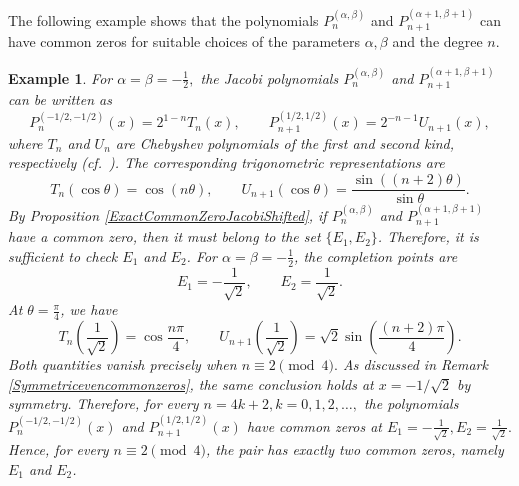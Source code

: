 \documentclass[final,3p,times,12pt]{elsarticle}
\newtheorem{example}{Example}[section]
\numberwithin{equation}{section}  %
\begin{document}
The following example shows that the polynomials $P_n^{(\alpha,\beta)}$ and $P_{n+1}^{(\alpha+1,\beta+1)}$ can have common zeros for suitable choices of the parameters $\alpha,\beta$ and the degree $n$.
	\begin{example}
		For 	$\alpha=\beta=-\frac{1}{2},$ the Jacobi polynomials $P_n^{(\alpha,\beta)}$ and $P_{n+1}^{(\alpha+1,\beta+1)}$ can be written as
		\begin{equation*}
			P_n^{(-1/2,-1/2)}(x)= 2^{1-n}T_n(x),
			\qquad
			P_{n+1}^{(1/2,1/2)}(x)=2^{-n-1}U_{n+1}(x),
		\end{equation*}
		where $T_n$ and $U_n$ are Chebyshev polynomials of the first and second kind, respectively (cf.~\cite[p.~60, Eq.~(4.1.7)]{Szego-OP-Book}).
	The corresponding trigonometric representations are
		\begin{equation*}
			T_n(\cos\theta)=\cos(n\theta),
			\qquad
			U_{n+1}(\cos\theta)=\frac{\sin((n+2)\theta)}{\sin\theta}.
		\end{equation*}
		By Proposition \ref{ExactCommonZeroJacobiShifted}, if  $P_n^{(\alpha,\beta)}$ and $P_{n+1}^{(\alpha+1,\beta+1)}$  have a common zero, then it must belong to the set
		$\{E_1,E_2\}$. Therefore, it is sufficient to check $E_1$ and $E_2$.
		For	$\alpha=\beta=-\frac{1}{2}$, the completion points are
		\begin{equation*}
			E_1=-\frac1{\sqrt2},
			\qquad
			E_2=\frac1{\sqrt2}.
		\end{equation*}
		At $\theta=\frac{\pi}{4}$, we have
		\begin{equation*}
			T_n\left(\frac1{\sqrt2}\right)	=	\cos\frac{n\pi}{4}, \qquad 	U_{n+1}\left(\frac1{\sqrt2}\right)	=	\sqrt{2}\sin\left(\frac{(n+2)\pi}{4}\right).
		\end{equation*}
		Both quantities vanish precisely when $	n\equiv 2 \pmod 4.$ As discussed in Remark \ref{Symmetricevencommonzeros},
		the same conclusion holds at $x=-1/\sqrt2$ by symmetry.	Therefore, for every $	n=4k+2, k=0,1,2,\ldots,$
		the polynomials $	P_n^{(-1/2,-1/2)}(x)$ and	$P_{n+1}^{(1/2,1/2)}(x)$ have common zeros at $\displaystyle 	E_1=-\frac1{\sqrt2},
		E_2=\frac1{\sqrt2}.$	Hence, for every $n\equiv2\pmod4$, the pair has exactly two common zeros,
		namely $E_1$ and $E_2$.
	\end{example}
	
\end{document}
